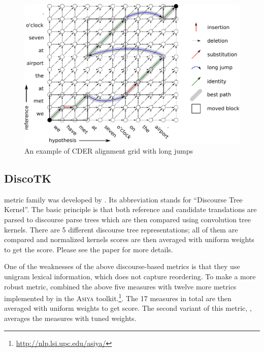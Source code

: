 \begin{figure}
    \begin{center}
        \includegraphics[width=12cm]{img/cder-grid.pdf}
    \end{center}

    \caption{An example of CDER alignment grid with long jumps}
    \label{cder-grid}
\end{figure}

\subsection{DiscoTK}

 metric family was developed by .
Its abbreviation stands for ``Discourse Tree Kernel''. The basic principle is
that both reference and candidate translations are parsed to discourse parse
trees which are then compared using convolution tree kernels. There are 5
different discourse tree representations; all of them are compared and
normalized kernels scores are then averaged with uniform weights to get the
 score.  Please see the paper for more details.

One of the weaknesses of the above discourse-based metrics is that they use
unigram lexical information, which does not capture reordering. To make a more
robust metric,  combined the above five measures
with twelve more metrics implemented by  in the
\textsc{Asiya} toolkit.\footnote{\url{http://nlp.lsi.upc.edu/asiya/}}. The 17
measures in total are then averaged with uniform weights to get
 score. The second variant of this metric,
, averages the measures with tuned weights.

